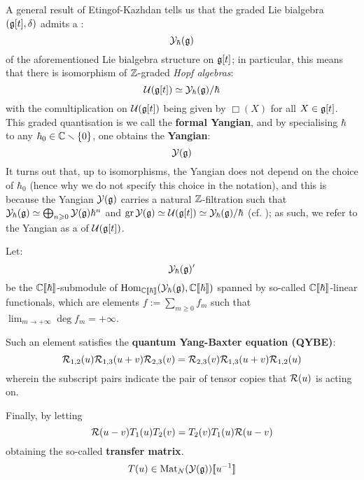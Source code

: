         A general result of Etingof-Kazhdan tells us that the graded Lie bialgebra $(\mathfrak{g}[t], \delta)$ admits a :
            $$\mathcal{Y}_{\hbar}(\mathfrak{g})$$
        of the aforementioned Lie bialgebra structure on $\mathfrak{g}[t]$; in particular, this means that there is isomorphism of $\mathbb{Z}$-graded \textit{Hopf algebras}:
            $$\mathcal{U}(\mathfrak{g}[t]) \simeq \mathcal{Y}_{\hbar}(\mathfrak{g})/\hbar$$
        with the comultiplication on $\mathcal{U}(\mathfrak{g}[t])$ being given by $\Box(X)$ for all $X \in \mathfrak{g}[t]$. This graded quantisation is we call the \textbf{formal Yangian}, and by specialising $\hbar$ to any $\hbar_0 \in \mathbb{C} \smallsetminus \{0\}$, one obtains the \textbf{Yangian}:
            $$\mathcal{Y}(\mathfrak{g})$$
        It turns out that, up to isomorphisms, the Yangian does not depend on the choice of $\hbar_0$ (hence why we do not specify this choice in the notation), and this is because the Yangian $\mathcal{Y}(\mathfrak{g})$ carries a natural $\mathbb{Z}$-filtration such that $\mathcal{Y}_{\hbar}(\mathfrak{g}) \simeq \bigoplus_{n \geqslant 0} \mathcal{Y}(\mathfrak{g}) \hbar^n$ and $\operatorname{gr} \mathcal{Y}(\mathfrak{g}) \simeq \mathcal{U}(\mathfrak{g}[t]) \simeq \mathcal{Y}_{\hbar}(\mathfrak{g})/\hbar$ (cf. \cite{drinfeld_original_yangian_paper}); as such, we refer to the Yangian as a  of $\mathcal{U}(\mathfrak{g}[t])$.

        Let:
            $$\mathcal{Y}_{\hbar}(\mathfrak{g})'$$
        be the $\mathbb{C}[\![\hbar]\!]$-submodule of $\mathrm{Hom}_{\mathbb{C}[\![\hbar]\!]}( \mathcal{Y}_{\hbar}(\mathfrak{g}), \mathbb{C}[\![\hbar]\!] )$ spanned by so-called  $\mathbb{C}[\![\hbar]\!]$-linear functionals, which are elements $f := \sum_{m \geq 0} f_m$ such that $\lim_{m \to +\infty} \deg f_m = +\infty$.
            
        Such an element satisfies the \textbf{quantum Yang-Baxter equation (QYBE)}:
            \begin{equation} \label{equation: QYBE}
                \mathcal{R}_{1, 2}(u) \mathcal{R}_{1, 3}(u + v) \mathcal{R}_{2, 3}(v) = \mathcal{R}_{2, 3}(v) \mathcal{R}_{1, 3}(u + v) \mathcal{R}_{1, 2}(u)
            \end{equation}
        wherein the subscript pairs indicate the pair of tensor copies that $\mathcal{R}(u)$ is acting on.

        Finally, by letting 
            \begin{equation} \label{equation: RTT_relation}
                \mathcal{R}(u - v) T_1(u) T_2(v) = T_2(v) T_1(u) \mathcal{R}(u - v)
            \end{equation}
        obtaining the so-called \textbf{transfer matrix}.
            $$T(u) \in \mathrm{Mat}_N( \mathcal{Y}(\mathfrak{g}) )[\![u^{-1}]\!]$$
    
